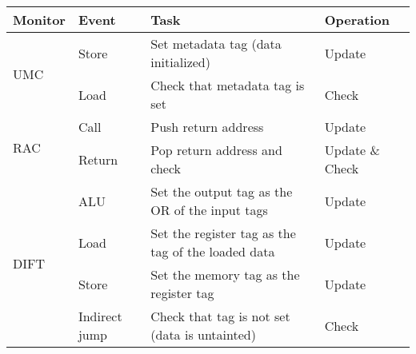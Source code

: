 

\begin{tabular}{|l|l|l|l|}
\hline

{\bf Monitor} & {\bf Event} & {\bf Task} & {\bf Operation} \\ \hline \hline

\multirow{2}{*}{UMC}  
 & Store & Set metadata tag (data initialized) & Update \\ \cline{2-4}
 & Load & Check that metadata tag is set & Check \\ 
\hline\hline

\multirow{2}{*}{RAC}  
 & Call & Push return address & Update \\ \cline{2-4}
 & Return & Pop return address and check & Update \& Check \\ 
\hline\hline

\multirow{4}{*}{DIFT}  
 & ALU & Set the output tag as the OR of the input tags & Update \\ \cline{2-4}
 & Load & Set the register tag as the tag of the loaded data & Update \\ \cline{2-4}
 & Store & Set the memory tag as the register tag & Update \\ \cline{2-4}
 & Indirect jump & Check that tag is not set (data is untainted) & Check \\ \hline

\end{tabular}
